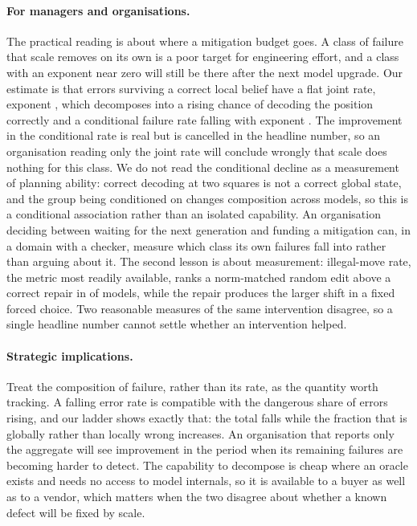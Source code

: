 \documentclass[11pt]{article}
\begin{document}
\paragraph{For managers and organisations.}
The practical reading is about where a mitigation budget goes. A class of failure
that scale removes on its own is a poor target for engineering effort, and a class
with an exponent near zero will still be there after the next model upgrade. Our
estimate is that errors surviving a correct local belief have a flat joint rate,
exponent , which decomposes into a rising chance of decoding the
position correctly and a conditional failure rate falling with exponent .
The improvement in the conditional rate is real but is cancelled in the headline
number, so an
organisation reading only the joint rate will conclude wrongly that scale does nothing
for this class. We do not read the conditional decline as a measurement of planning
ability: correct decoding at two squares is not a correct global state, and the group
being conditioned on changes composition across models, so this is a conditional
association rather than an isolated capability.
An organisation deciding between waiting for the next generation and funding a
mitigation can, in a domain with a checker, measure which class its own failures
fall into rather than arguing about it. The second lesson is about measurement:
illegal-move rate, the metric most readily available, ranks a norm-matched random
edit above a correct repair in  of  models, while the repair
produces the larger shift in a fixed forced choice. Two reasonable measures of the
same intervention disagree, so a single headline number cannot settle whether an
intervention helped.

\paragraph{Strategic implications.}
Treat the composition of failure, rather than its rate, as the quantity worth
tracking. A falling error rate is compatible with the dangerous share of errors
rising, and our ladder shows exactly that: the total falls while the fraction that
is globally rather than locally wrong increases. An organisation that reports only
the aggregate will see improvement in the period when its remaining failures are
becoming harder to detect. The capability to decompose is cheap where an oracle
exists and needs no access to model internals, so it is available to a buyer as well
as to a vendor, which matters when the two disagree about whether a known defect
will be fixed by scale.
\end{document}
